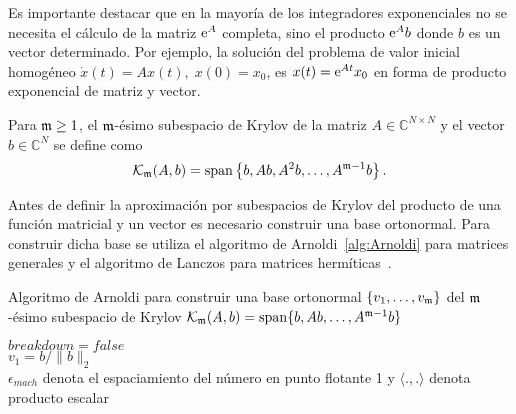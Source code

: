 Es importante destacar que en la mayoría de los integradores exponenciales
 no se necesita el cálculo de la matriz $\mathrm{e}^{A}$ completa, sino
el producto $\mathrm{e}^{A}b$ donde $b$ es un vector determinado. Por ejemplo, la solución del problema de valor inicial homogéneo $\dot{x}(t)=Ax(t),\;x(0)=x_0$, es $x(t)=\mathrm{e}^{At}x_0$ en forma de producto exponencial de matriz y vector. 
\begin{definition}
        \cite{Saad92} Para $\mathfrak{m}\geq 1$, el $\mathfrak{m}$-ésimo subespacio de Krylov de la matriz $A\in\mathbb{C}^{N\times N}$
    y el vector $b\in\mathbb{C}^{N}$ se define como
    \[ \mathcal{K}_{\mathfrak{m}}(A,b)=\mathrm{span}\left\{ b,Ab,A^{2}b,\ldots,A^{\mathfrak{m}-1}b \right\}. \]
\end{definition}

Antes de definir la aproximación por subespacios de Krylov del producto de una función matricial y un vector es
necesario construir una base ortonormal. Para construir dicha base se utiliza el algoritmo de
Arnoldi~\ref{alg:Arnoldi} para matrices generales y el algoritmo de 
Lanczos para matrices hermíticas~\cite{arnoldi,saad2003iterative}.
{\SetAlgoNoLine
\begin{algorithm}
    \caption{Algoritmo de Arnoldi para construir una base ortonormal $\{ v_1,\ldots,v_{\mathfrak{m}} \}$ del $\mathfrak{m}$-ésimo subespacio de Krylov $\mathcal{K}_{\mathfrak{m}}(A,b)=\mathrm{span} \{ b,Ab,\ldots, A^{\mathfrak{m}-1}b \}$}
    \label{alg:Arnoldi}

    $breakdown=false$\\
    $v_1=b/\lVert b \rVert_2$\\
\nonl $\epsilon_{mach}$ denota el espaciamiento del número en punto flotante 1 y $\langle . , .\rangle$ denota producto escalar
\end{algorithm}
}

